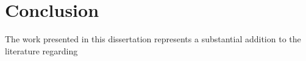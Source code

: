 \chapter{Conclusion}

The work presented in this dissertation represents a substantial addition to the literature regarding 

